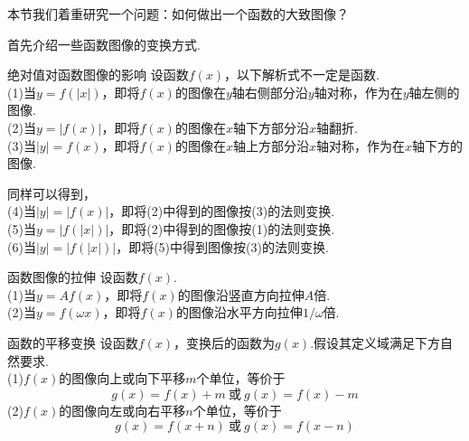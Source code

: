 \documentclass[lang=cn, zihao=5]{elegantbook}
\begin{document}
本节我们着重研究一个问题：如何做出一个函数的大致图像？

首先介绍一些函数图像的变换方式.

\begin{proposition}{绝对值对函数图像的影响}
    设函数$f(x)$，以下解析式不一定是函数.\\
    (1)当$y=f(|x|)$，即将$f(x)$的图像在$y$轴右侧部分沿$y$轴对称，作为在$y$轴左侧的图像.\\
    (2)当$y=|f(x)|$，即将$f(x)$的图像在$x$轴下方部分沿$x$轴翻折.\\
    (3)当$|y|=f(x)$，即将$f(x)$的图像在$x$轴上方部分沿$x$轴对称，作为在$x$轴下方的图像.
\end{proposition}

\begin{remark}
	同样可以得到，\\ 
    (4)当$|y|=|f(x)|$，即将(2)中得到的图像按(3)的法则变换.\\
    (5)当$y=|f(|x|)|$，即将(2)中得到的图像按(1)的法则变换.\\
    (6)当$|y|=|f(|x|)|$，即将(5)中得到图像按(3)的法则变换.
\end{remark}

\begin{proposition}{函数图像的拉伸}
    设函数$f(x)$.\\
    (1)当$y=Af(x)$，即将$f(x)$的图像沿竖直方向拉伸$A$倍.\\
    (2)当$y=f(\omega x)$，即将$f(x)$的图像沿水平方向拉伸$1/\omega$倍.
\end{proposition}

\begin{proposition}{函数的平移变换}
    设函数$f(x)$，变换后的函数为$g(x)$.假设其定义域满足下方自然要求.\\
    (1)$f(x)$的图像向上或向下平移$m$个单位，等价于$$g(x)=f(x)+m \ \text{或} \ g(x)=f(x)-m$$
    (2)$f(x)$的图像向左或向右平移$n$个单位，等价于$$g(x)=f(x+n) \ \text{或} \ g(x)=f(x-n)$$
\end{proposition}
\end{document}
